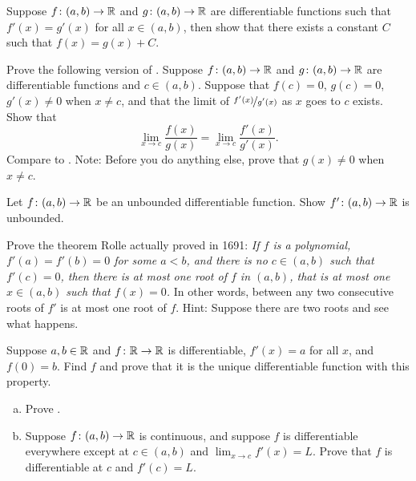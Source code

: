 \begin{exercise} \label{exercise:samediffconst}
Suppose $f \colon (a,b) \to {\mathbb{R}}$ and $g \colon (a,b) \to {\mathbb{R}}$ are
differentiable functions such that $f'(x) = g'(x)$ for all $x \in (a,b)$,
then show that there exists a constant $C$ such that $f(x) = g(x) + C$.
\end{exercise}

\begin{exercise}
Prove the following version of .
Suppose 
$f \colon (a,b) \to {\mathbb{R}}$ and $g \colon (a,b) \to {\mathbb{R}}$ are differentiable
functions and $c \in (a,b)$.  Suppose that $f(c) = 0$, $g(c)=0$,
$g'(x) \not= 0$ when $x \not= c$, and
that the limit of $\nicefrac{f'(x)}{g'(x)}$ as $x$ goes to $c$ exists.  Show that
\begin{equation*}
\lim_{x \to c} \frac{f(x)}{g(x)} = 
\lim_{x \to c} \frac{f'(x)}{g'(x)} .
\end{equation*}
Compare to .
Note: Before you do anything else, prove that $g(x) \not= 0$ when $x \not= c$.
\end{exercise}

\begin{exercise}
Let $f \colon (a,b) \to {\mathbb{R}}$ be an unbounded differentiable function.  Show
$f' \colon (a,b) \to {\mathbb{R}}$ is unbounded.
\end{exercise}

\begin{exercise}
Prove the theorem Rolle actually proved in 1691:
\emph{If $f$ is a polynomial,
$f'(a) = f'(b) = 0$ for some $a < b$,
and there is no $c \in (a,b)$ such that $f'(c) = 0$,
then there is at most one root of $f$ in $(a,b)$,
that is at most one $x \in (a,b)$ such that $f(x) = 0$.}
In other words, between any two consecutive roots of $f'$ is at most one
root of $f$.
Hint: Suppose there are two roots and see what happens.
\end{exercise}

\begin{exercise}
Suppose $a,b \in {\mathbb{R}}$ and $f \colon {\mathbb{R}} \to {\mathbb{R}}$ is differentiable,
$f'(x) = a$ for all $x$, and $f(0) = b$.  Find $f$ and prove that 
it is the unique differentiable function with this property.
\end{exercise}

\begin{exercise} \label{exercise:endpointderivative}
\leavevmode
\begin{enumerate}[a)]
\item
Prove .
\item 
Suppose $f \colon (a,b) \to {\mathbb{R}}$ is continuous, and suppose $f$ is differentiable everywhere except at $c \in
(a,b)$ and $\lim_{x \to c} f'(x) = L$.
Prove that $f$ is differentiable at
$c$ and $f'(c) = L$.
\end{enumerate}
\end{exercise}

